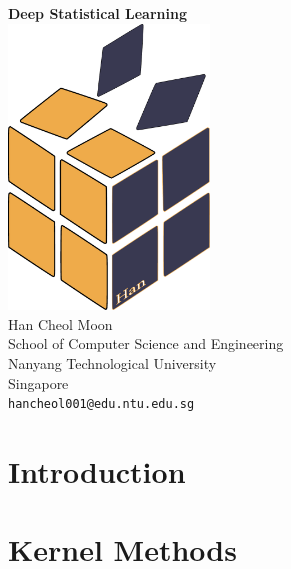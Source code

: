 \documentclass[oneside, a4paper,11pt]{book}
\begin{document}
\begin{titlepage}
	\begin{center}
		\vspace*{5.5cm}
		\textbf{\Huge Deep Statistical Learning}\\
        \vspace{2.5cm}
		\includegraphics[width=0.4\textwidth]{./logo/new_logo.pdf}\\
        \vspace{1.5cm}
        \vspace{1.5cm}
		Han Cheol Moon\\
		School of Computer Science and Engineering\\
		Nanyang Technological University\\
		Singapore\\
		\texttt{hancheol001@edu.ntu.edu.sg}
		\date{\today}
	\end{center}
\end{titlepage}

\tableofcontents
\newpage

\mainmatter
\part{Introduction}





\part{Kernel Methods}



% 
\end{document}
